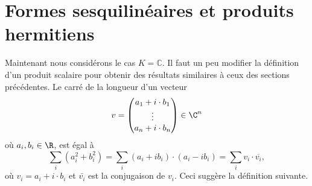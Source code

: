 \section{Formes sesquilinéaires et produits hermitiens}
\label{sec:form-sesq-et}

Maintenant nous considérons le cas $K = ℂ$.
Il faut un peu modifier la définition d'un produit scalaire pour
obtenir des résultats similaires à ceux des sections précédentes.  Le
carré de la longueur d'un vecteur
\begin{displaymath}
  v =
  \begin{pmatrix}
    a_1 + i\cdot  b_1 \\
    \vdots \\
    a_n + i \cdot b_n
  \end{pmatrix} \in \C^n
\end{displaymath}
où $a_i,b_i \in \R$, est égal à 
\begin{displaymath}
  \sum_i (a_i^2 + b_i^2) = \sum_i (a_i + i b_i) \cdot (a_i - i b_i) = \sum_i v_i \cdot \overline{v_i}, 
\end{displaymath}
où $v_i = a_i + i \cdot b_i$ et $\bar{v_i}$ est la conjugaison de $v_i$. Ceci suggère la définition suivante. 

